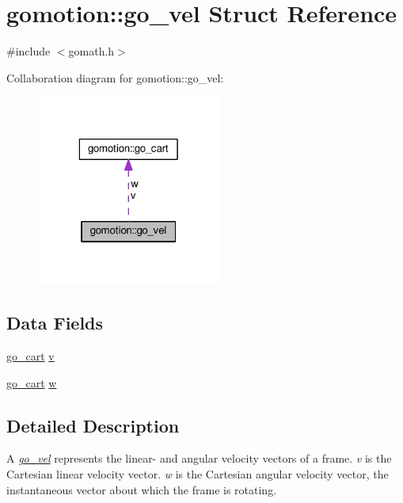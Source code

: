 \hypertarget{structgomotion_1_1go__vel}{\section{gomotion\-:\-:go\-\_\-vel Struct Reference}
\label{structgomotion_1_1go__vel}
}


{\ttfamily \#include $<$gomath.\-h$>$}



Collaboration diagram for gomotion\-:\-:go\-\_\-vel\-:\nopagebreak
\begin{figure}[H]
\begin{center}
\leavevmode
\includegraphics[width=172pt]{dc/dff/structgomotion_1_1go__vel__coll__graph}
\end{center}
\end{figure}
\subsection*{Data Fields}
\begin{DoxyCompactItemize}
\item 
\hyperlink{structgomotion_1_1go__cart}{go\-\_\-cart} \hyperlink{structgomotion_1_1go__vel_ad215a05296181ff4207f75155da830fa}{v}
\item 
\hyperlink{structgomotion_1_1go__cart}{go\-\_\-cart} \hyperlink{structgomotion_1_1go__vel_ae647d5de790b84dad0b91c6f65b998cb}{w}
\end{DoxyCompactItemize}


\subsection{Detailed Description}
A {\itshape \hyperlink{structgomotion_1_1go__vel}{go\-\_\-vel}} represents the linear-\/ and angular velocity vectors of a frame. {\itshape v} is the Cartesian linear velocity vector. {\itshape w} is the Cartesian angular velocity vector, the instantaneous vector about which the frame is rotating. 

